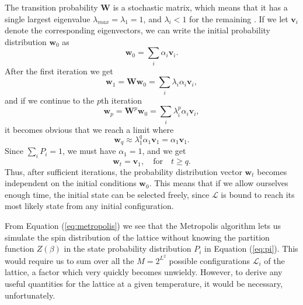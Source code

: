 \documentclass[]{article}
\begin{document}
The transition probability $\mathbf{W}$ is a stochastic matrix, which means that it has a single largest eigenvalue $\lambda_{max} = \lambda_1 = 1$, and $\lambda_i < 1$ for the remaining \cite{fys-stk4155-notes}. If we let $\mathbf{v}_i$ denote the corresponding eigenvectors, we can write the initial probability distribution $\mathbf{w}_{0}$ as
\begin{equation}
	\mathbf{w}_{0} = \sum_{i} \alpha_i \mathbf{v}_i.
\end{equation}
After the first iteration we get
\begin{equation}
	\mathbf{w}_{1} = \mathbf{W} \mathbf{w}_{0} = \sum_{i} \lambda_i \alpha_i \mathbf{v}_i,
\end{equation}
and if we continue to the $p$th iteration
\begin{equation}
	\mathbf{w}_{p} = \mathbf{W}^p \mathbf{w}_{0} = \sum_{i} \lambda_i^p \alpha_i \mathbf{v}_i,
\end{equation}
it becomes obvious that we reach a limit where
\begin{equation}
	\mathbf{w}_{q} \approx \lambda_1^q \alpha_1 \mathbf{v}_1 = \alpha_1 \mathbf{v}_1.
\end{equation}
Since $\sum_{i} P_i = 1$, we must have $\alpha_1 = 1$, and we get
\begin{equation} \label{eq:steady-state}
	\mathbf{w}_{t} = \mathbf{v}_1, \quad \text{for} \quad t \ge q.
\end{equation}
Thus, after sufficient iterations, the probability distribution vector $\mathbf{w}_{t}$ becomes independent on the initial conditions $\mathbf{w}_{0}$. This means that if we allow ourselves enough time, the initial state can be selected freely, since $\mathcal{L}$ is bound to reach its most likely state from any initial configuration. 

\vspace{5mm}

From Equation (\ref{eq:metropolis}) we see that the Metropolis algorithm lets us simulate the spin distribution of the lattice without knowing the partition function $Z(\beta)$ in the state probability distribution $P_i$ in Equation (\ref{eq:pi}). This would require us to sum over all the $M = 2^{L^2}$ possible configurations $\mathcal{L}_i$ of the lattice, a factor which very quickly becomes unwieldy. However, to derive any useful quantities for the lattice at a given temperature, it would be necessary, unfortunately.
\end{document}
